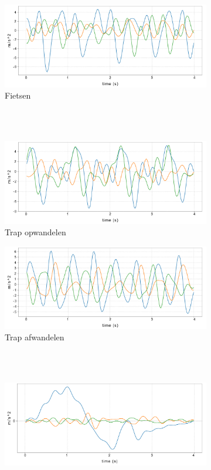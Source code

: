 \documentclass{article}
\begin{document}
\begin{figure}[h!]
  \begin{subfigure}[b]{.49\linewidth}
    \centering
    \includegraphics[width=.80\textwidth]{figures/fietsen}
    \caption{Fietsen}\label{fig:1d}
  \end{subfigure} \\~\\
  \begin{subfigure}[b]{.49\linewidth}
    \centering
    \includegraphics[width=.80\textwidth]{figures/trapop}
    \caption{Trap opwandelen}\label{fig:1e}
  \end{subfigure} 
  \begin{subfigure}[b]{.49\linewidth}
    \centering 
    \includegraphics[width=.80\textwidth]{figures/trapaf}
    \caption{Trap afwandelen}\label{fig:1f}
  \end{subfigure} \\~\\
  \begin{subfigure}[b]{.49\linewidth}
    \centering
    \includegraphics[width=.80\textwidth]{figures/liftau}

\end{subfigure}
\end{figure}
\end{document}
